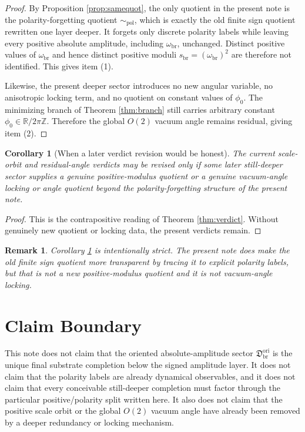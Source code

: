 \documentclass[11pt]{article}
\newcommand{\ScaleMod}{s_{\mathrm{br}}}
\newcommand{\OriginSector}{\mathfrak D_{\mathrm{br}}^{\mathrm{ori}}}
\newcommand{\AbsScaleAmp}{\omega_{\mathrm{br}}}
\newcommand{\PolarityQuot}{\sim_{\mathrm{pol}}}
\newtheorem{remark}{Remark}
\newtheorem{corollary}{Corollary}
\begin{document}
\begin{proof}
By Proposition \ref{prop:samequot}, the only quotient in the present note is the polarity-forgetting quotient \(\PolarityQuot\), which is exactly the old finite sign quotient rewritten one layer deeper. It forgets only discrete polarity labels while leaving every positive absolute amplitude, including \(\AbsScaleAmp\), unchanged. Distinct positive values of \(\AbsScaleAmp\) and hence distinct positive moduli \(\ScaleMod=(\AbsScaleAmp)^2\) are therefore not identified. This gives item (1).

Likewise, the present deeper sector introduces no new angular variable, no anisotropic locking term, and no quotient on constant values of \(\phi_0\). The minimizing branch of Theorem \ref{thm:branch} still carries arbitrary constant \(\phi_0\in\mathbb R/2\pi\mathbb Z\). Therefore the global \(O(2)\) vacuum angle remains residual, giving item (2).
\end{proof}

\begin{corollary}[When a later verdict revision would be honest]
\label{cor:revision}
The current scale-orbit and residual-angle verdicts may be revised only if some later still-deeper sector supplies a genuine positive-modulus quotient or a genuine vacuum-angle locking or angle quotient beyond the polarity-forgetting structure of the present note.
\end{corollary}

\begin{proof}
This is the contrapositive reading of Theorem \ref{thm:verdict}. Without genuinely new quotient or locking data, the present verdicts remain.
\end{proof}

\begin{remark}
Corollary \ref{cor:revision} is intentionally strict. The present note \emph{does} make the old finite sign quotient more transparent by tracing it to explicit polarity labels, but that is not a new positive-modulus quotient and it is not vacuum-angle locking.
\end{remark}

\section{Claim Boundary}

This note does not claim that the oriented absolute-amplitude sector \(\OriginSector\) is the unique final substrate completion below the signed amplitude layer. It does not claim that the polarity labels are already dynamical observables, and it does not claim that every conceivable still-deeper completion must factor through the particular positive/polarity split written here. It also does not claim that the positive scale orbit or the global \(O(2)\) vacuum angle have already been removed by a deeper redundancy or locking mechanism.
\end{document}
